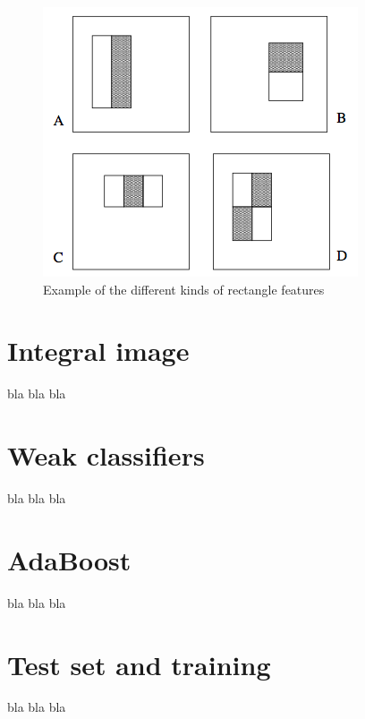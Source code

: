\begin{figure}[!h]
\begin{center}
\noindent \includegraphics[scale=0.6]{figures/haar_feature_description} 
\newline
\caption{Example of the different kinds of rectangle features}
\label{haar_feature_description}
\end{center} 
\end{figure}

\section{Integral image}

\noindent bla bla bla
\newline

\section{Weak classifiers}

\noindent bla bla bla
\newline

\section{AdaBoost}

\noindent bla bla bla
\newline

\section{Test set and training}

\noindent bla bla bla
\newline